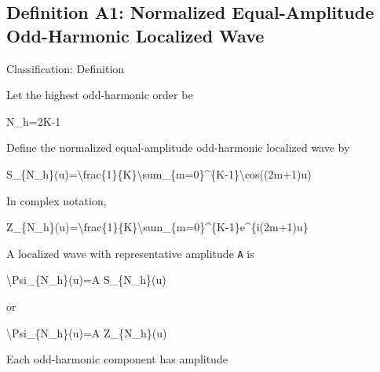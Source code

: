 \documentclass[
  a4paper,
]{article}
\newenvironment{Shaded}{}{}
\newcommand{\NormalTok}[1]{#1}
\begin{document}
\subsection{Definition A1: Normalized Equal-Amplitude Odd-Harmonic
Localized
Wave}\label{definition-a1-normalized-equal-amplitude-odd-harmonic-localized-wave}

Classification: Definition

Let the highest odd-harmonic order be

\begin{Shaded}
\begin{Highlighting}[]
\NormalTok{N\_h=2K{-}1}
\end{Highlighting}
\end{Shaded}

Define the normalized equal-amplitude odd-harmonic localized wave by

\begin{Shaded}
\begin{Highlighting}[]
\NormalTok{S\_\{N\_h\}(u)=\textbackslash{}frac\{1\}\{K\}\textbackslash{}sum\_\{m=0\}\^{}\{K{-}1\}\textbackslash{}cos((2m+1)u)}
\end{Highlighting}
\end{Shaded}

In complex notation,

\begin{Shaded}
\begin{Highlighting}[]
\NormalTok{Z\_\{N\_h\}(u)=\textbackslash{}frac\{1\}\{K\}\textbackslash{}sum\_\{m=0\}\^{}\{K{-}1\}e\^{}\{i(2m+1)u\}}
\end{Highlighting}
\end{Shaded}

A localized wave with representative amplitude \texttt{A} is

\begin{Shaded}
\begin{Highlighting}[]
\NormalTok{\textbackslash{}Psi\_\{N\_h\}(u)=A S\_\{N\_h\}(u)}
\end{Highlighting}
\end{Shaded}

or

\begin{Shaded}
\begin{Highlighting}[]
\NormalTok{\textbackslash{}Psi\_\{N\_h\}(u)=A Z\_\{N\_h\}(u)}
\end{Highlighting}
\end{Shaded}

Each odd-harmonic component has amplitude
\end{document}
